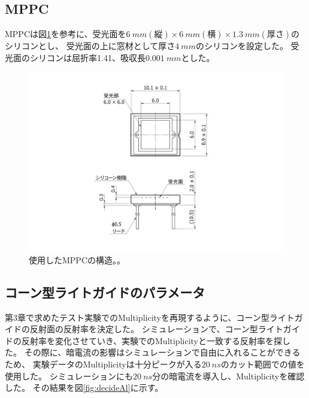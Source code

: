 \subsection{MPPC}
MPPCは図\ref{fig:MPPCshape}を参考に、受光面を$\SI{6}{mm}(縦)\times\SI{6}{mm}(横)\times\SI{1.3}{mm}(厚さ)$のシリコンとし、
受光面の上に窓材として厚さ$\SI{4}{mm}$のシリコンを設定した。
受光面のシリコンは屈折率1.41、吸収長$\SI{0.001}{mm}$とした。

\begin{figure}
  \centering
  \includegraphics[width=15cm]{images/chapter4/MPPCshape.pdf}
  \caption{使用したMPPCの構造。。}
  \label{fig:MPPCshape}
\end{figure}

\subsection{コーン型ライトガイドのパラメータ}
第3章で求めたテスト実験でのMultiplicityを再現するように、コーン型ライトガイドの反射面の反射率を決定した。
シミュレーションで、コーン型ライトガイドの反射率を変化させていき、実験でのMultiplicityと一致する反射率を探した。
その際に、暗電流の影響はシミュレーションで自由に入れることができるため、
実験データのMultiplicityは十分ピークが入る$\SI{20}{ns}$のカット範囲での値を使用した。
シミュレーションにも$\SI{20}{ns}$分の暗電流を導入し、Multiplicityを確認した。
その結果を図\ref{fig:decideAl}に示す。

